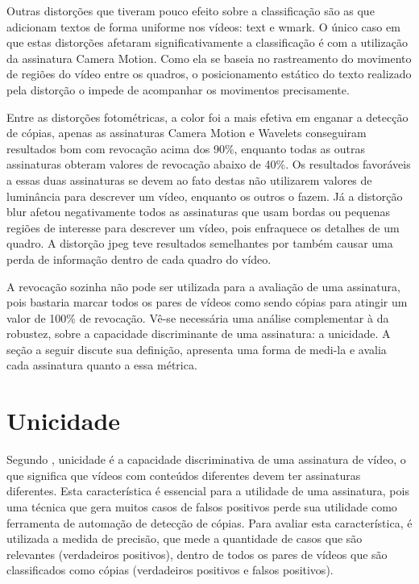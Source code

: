 Outras distorções que tiveram pouco efeito sobre a classificação são as que adicionam textos de forma uniforme nos vídeos: text e wmark. O único caso em que estas distorções afetaram significativamente a classificação é com a utilização da assinatura Camera Motion. Como ela se baseia no rastreamento do movimento de regiões do vídeo entre os quadros, o posicionamento estático do texto realizado pela distorção o impede de acompanhar os movimentos precisamente.

Entre as distorções fotométricas, a color foi a mais efetiva em enganar a detecção de cópias, apenas as assinaturas Camera Motion e Wavelets conseguiram resultados bom com revocação acima dos 90\%, enquanto todas as outras assinaturas obteram valores de revocação abaixo de 40\%. Os resultados favoráveis a essas duas assinaturas se devem ao fato destas não utilizarem valores de luminância para descrever um vídeo, enquanto os outros o fazem. Já a distorção blur afetou negativamente todos as assinaturas que usam bordas ou pequenas regiões de interesse para descrever um vídeo, pois enfraquece os detalhes de um quadro. A distorção jpeg teve resultados semelhantes por também causar uma perda de informação dentro de cada quadro do vídeo. 


A revocação sozinha não pode ser utilizada para a avaliação de uma assinatura, pois bastaria marcar todos os pares de vídeos como sendo cópias para atingir um valor de 100\% de revocação. Vê-se necessária uma análise complementar à da robustez, sobre a capacidade discriminante de uma assinatura: a unicidade. A seção a seguir discute sua definição, apresenta uma forma de medi-la e avalia cada assinatura quanto a essa métrica.

\section{Unicidade}

Segundo , unicidade é a capacidade discriminativa de uma assinatura de vídeo, o que significa que vídeos com conteúdos diferentes devem ter assinaturas diferentes. Esta característica é essencial para a utilidade de uma assinatura, pois uma técnica que gera muitos casos de falsos positivos perde sua utilidade como ferramenta de automação de detecção de cópias. Para avaliar esta característica, é utilizada a medida de precisão, que mede a quantidade de casos que são relevantes (verdadeiros positivos), dentro de todos os pares de vídeos que são classificados como cópias (verdadeiros positivos e falsos positivos)\cite{Ting2010}.

